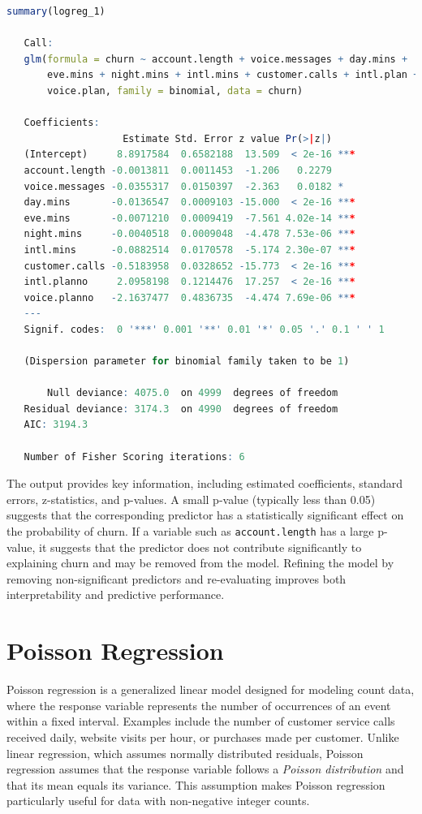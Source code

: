 \documentclass[
  11pt,
]{book}
\newcommand{\passthrough}[1]{#1}
\theoremstyle{definition}
\theoremstyle{definition}
\theoremstyle{definition}
\theoremstyle{definition}
\theoremstyle{remark}
\begin{document}
\begin{lstlisting}[language=R]
summary(logreg_1)
   
   Call:
   glm(formula = churn ~ account.length + voice.messages + day.mins + 
       eve.mins + night.mins + intl.mins + customer.calls + intl.plan + 
       voice.plan, family = binomial, data = churn)
   
   Coefficients:
                    Estimate Std. Error z value Pr(>|z|)    
   (Intercept)     8.8917584  0.6582188  13.509  < 2e-16 ***
   account.length -0.0013811  0.0011453  -1.206   0.2279    
   voice.messages -0.0355317  0.0150397  -2.363   0.0182 *  
   day.mins       -0.0136547  0.0009103 -15.000  < 2e-16 ***
   eve.mins       -0.0071210  0.0009419  -7.561 4.02e-14 ***
   night.mins     -0.0040518  0.0009048  -4.478 7.53e-06 ***
   intl.mins      -0.0882514  0.0170578  -5.174 2.30e-07 ***
   customer.calls -0.5183958  0.0328652 -15.773  < 2e-16 ***
   intl.planno     2.0958198  0.1214476  17.257  < 2e-16 ***
   voice.planno   -2.1637477  0.4836735  -4.474 7.69e-06 ***
   ---
   Signif. codes:  0 '***' 0.001 '**' 0.01 '*' 0.05 '.' 0.1 ' ' 1
   
   (Dispersion parameter for binomial family taken to be 1)
   
       Null deviance: 4075.0  on 4999  degrees of freedom
   Residual deviance: 3174.3  on 4990  degrees of freedom
   AIC: 3194.3
   
   Number of Fisher Scoring iterations: 6
\end{lstlisting}

The output provides key information, including estimated coefficients, standard errors, z-statistics, and p-values. A small p-value (typically less than 0.05) suggests that the corresponding predictor has a statistically significant effect on the probability of churn. If a variable such as \passthrough{\lstinline!account.length!} has a large p-value, it suggests that the predictor does not contribute significantly to explaining churn and may be removed from the model. Refining the model by removing non-significant predictors and re-evaluating improves both interpretability and predictive performance.

\section{Poisson Regression}\label{poisson-regression}

Poisson regression is a generalized linear model designed for modeling count data, where the response variable represents the number of occurrences of an event within a fixed interval. Examples include the number of customer service calls received daily, website visits per hour, or purchases made per customer. Unlike linear regression, which assumes normally distributed residuals, Poisson regression assumes that the response variable follows a \emph{Poisson distribution} and that its mean equals its variance. This assumption makes Poisson regression particularly useful for data with non-negative integer counts.
\end{document}
